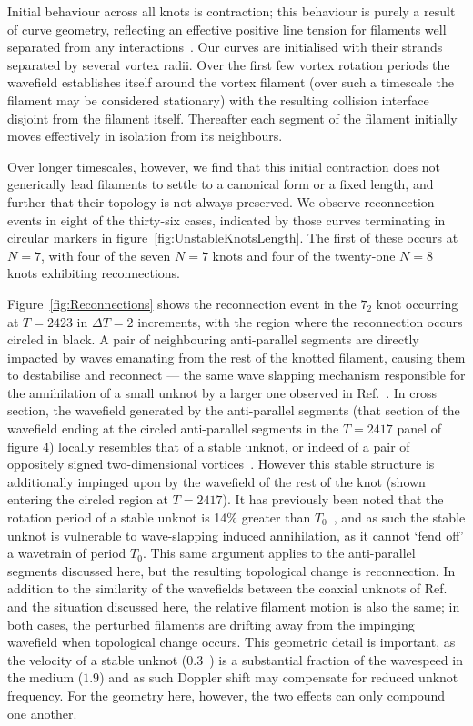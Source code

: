 Initial behaviour across all knots is contraction; this behaviour is purely a result of curve geometry, reflecting an effective positive line tension for filaments well separated from any interactions~\citep{Biktashev1994}. Our curves are initialised with their strands separated by several vortex radii. Over the first few vortex rotation periods the wavefield establishes itself around the vortex filament (over such a timescale the filament may be considered stationary) with the resulting collision interface disjoint from the filament itself. Thereafter each segment of the filament initially moves effectively in isolation from its neighbours. 

Over longer timescales, however, we find that this initial contraction does not generically lead filaments to settle to a canonical form or a fixed length, and further that their topology is not always preserved. We observe reconnection events in eight of the thirty-six cases, indicated by those curves terminating in circular markers in figure~\ref{fig:UnstableKnotsLength}. The first of these occurs at $N=7$, with four of the seven $N=7$ knots and four of the twenty-one $N=8$ knots exhibiting reconnections.

Figure~\ref{fig:Reconnections} shows the reconnection event in the $7_2$ knot occurring at $T=2423$ in $\Delta T=2$ increments, with the region where the reconnection occurs circled in black. A pair of neighbouring anti-parallel segments are directly impacted by waves emanating from the rest of the knotted filament, causing them to destabilise and reconnect --- the same wave slapping mechanism responsible for the annihilation of a small unknot by a larger one observed in Ref.~\citep{Maucher2018}. In cross section, the wavefield generated by the anti-parallel segments (that section of the wavefield ending at the circled anti-parallel segments in the $T=2417$ panel of figure 4) locally resembles that of a stable unknot, or indeed of a pair of oppositely signed two-dimensional vortices~\citep{Courtemanche1990}. However this stable structure is additionally impinged upon by the wavefield of the rest of the knot (shown entering the circled region at $T=2417$). It has previously been noted that the rotation period of a stable unknot is 14\% greater than $T_0$~\citep{Maucher2018}, and as such the stable unknot is vulnerable to wave-slapping induced annihilation, as it cannot `fend off' a wavetrain of period $T_0$. This same argument applies to the anti-parallel segments discussed here, but the resulting topological change is reconnection. In addition to the similarity of the wavefields between the coaxial unknots of Ref.~\citep{Maucher2018} and the situation discussed here, the relative filament motion is also the same; in both cases, the perturbed filaments are drifting away from the impinging wavefield when topological change occurs. This geometric detail is important, as the velocity of a stable unknot ($0.3$~\citep{Maucher2018}) is a substantial fraction of the wavespeed in the medium ($1.9$) and as such Doppler shift may compensate for reduced unknot frequency. For the geometry here, however, the two effects can only compound one another. 

